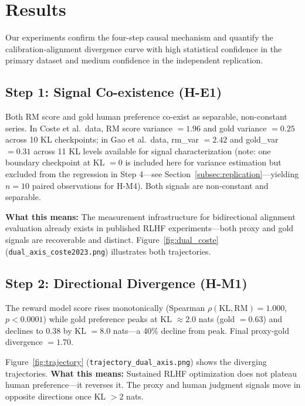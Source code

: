 \section{Results}
\label{sec:results}

Our experiments confirm the four-step causal mechanism and quantify the calibration-alignment divergence curve with high statistical confidence in the primary dataset and medium confidence in the independent replication.

\subsection{Step 1: Signal Co-existence (H-E1)}

Both RM score and gold human preference co-exist as separable, non-constant series. In Coste et al.\ data, RM score variance $= 1.96$ and gold variance $= 0.25$ across 10 KL checkpoints; in Gao et al.\ data, rm\_var $= 2.42$ and gold\_var $= 0.31$ across 11 KL levels available for signal characterization (note: one boundary checkpoint at KL $= 0$ is included here for variance estimation but excluded from the regression in Step 4---see Section~\ref{subsec:replication}---yielding $n=10$ paired observations for H-M4). Both signals are non-constant and separable.

\textbf{What this means:} The measurement infrastructure for bidirectional alignment evaluation already exists in published RLHF experiments---both proxy and gold signals are recoverable and distinct. Figure~\ref{fig:dual_coste} (\texttt{dual\_axis\_coste2023.png}) illustrates both trajectories.

\subsection{Step 2: Directional Divergence (H-M1)}

The reward model score rises monotonically (Spearman $\rho(\text{KL}, \text{RM}) = 1.000$, $p < 0.0001$) while gold preference peaks at KL $\approx 2.0$ nats (gold $= 0.63$) and declines to $0.38$ by KL $= 8.0$ nats---a 40\% decline from peak. Final proxy-gold divergence $= 1.70$.

Figure~\ref{fig:trajectory} (\texttt{trajectory\_dual\_axis.png}) shows the diverging trajectories. \textbf{What this means:} Sustained RLHF optimization does not plateau human preference---it reverses it. The proxy and human judgment signals move in opposite directions once KL $> 2$ nats.

